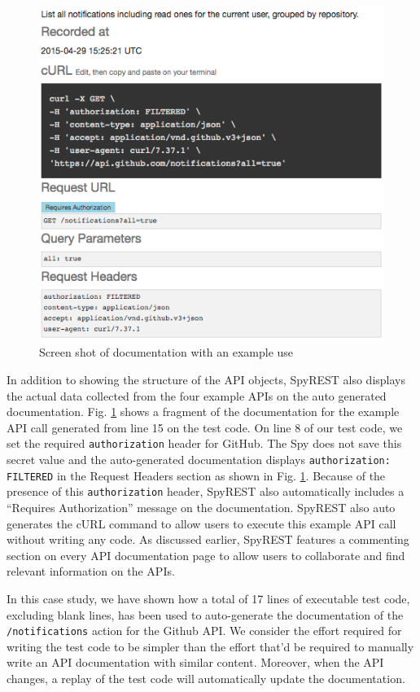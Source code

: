 \documentclass[conference]{IEEEtran}
\begin{document}
\begin{figure}[!tbh]
  \centering
  \includegraphics[width=\linewidth]{notification_example.png}
  \caption{Screen shot of documentation with an example use}
  \label{fig:notification_example}
\end{figure}

In addition to showing the structure of the API objects, SpyREST also displays the actual data collected from the four example APIs on the auto generated documentation. Fig. \ref{fig:notification_example} shows a fragment of the documentation for the example API call generated from line 15 on the test code. On line 8 of our test code, we set the required \texttt{authorization} header for GitHub. The Spy does not save this secret value and the auto-generated documentation displays \texttt{authorization: FILTERED} in the Request Headers section as shown in Fig. \ref{fig:notification_example}. Because of the presence of this \texttt{authorization} header, SpyREST also automatically includes a ``Requires Authorization'' message on the documentation. SpyREST also auto generates the cURL command to allow users to execute this example API call without writing any code. As discussed earlier, SpyREST features a commenting section on every API documentation page to allow users to collaborate and find relevant information on the APIs.

In this case study, we have shown how a total of 17 lines of executable test code, excluding blank lines, has been used to auto-generate the documentation of the \texttt{/notifications} action for the Github API. We consider the effort required for writing the test code to be simpler than the effort that'd be required to manually write an API documentation with similar content. Moreover, when the API changes, a replay of the test code will automatically update the documentation.
\end{document}
